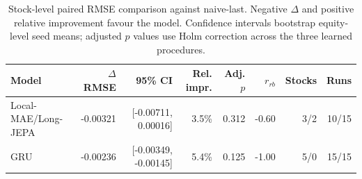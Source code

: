 \begin{table}[t]
\centering
\small
\caption{Stock-level paired RMSE comparison against naive-last. Negative $\Delta$ and positive relative improvement favour the model. Confidence intervals bootstrap equity-level seed means; adjusted $p$ values use Holm correction across the three learned procedures.}
\label{tab:paired_rmse_naive}
\begin{tabular}{lrrrrrrr}
\toprule
Model & $\Delta$RMSE & 95\% CI & Rel. impr. & Adj. $p$ & $r_{rb}$ & Stocks & Runs \\
\midrule
Local-MAE/Long-JEPA & -0.00321 & [-0.00711, 0.00016] & 3.5\% & 0.312 & -0.60 & 3/2 & 10/15 \\
GRU & -0.00236 & [-0.00349, -0.00145] & 5.4\% & 0.125 & -1.00 & 5/0 & 15/15 \\
\bottomrule
\end{tabular}
\end{table}
